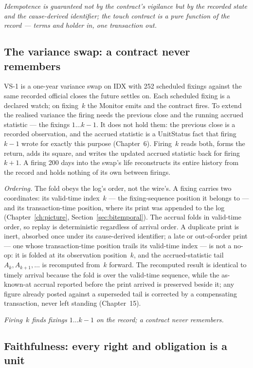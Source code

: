 \emph{Idempotence is guaranteed not by the contract's vigilance but by the
recorded state and the cause-derived identifier; the touch contract is a pure
function of the record --- terms and holder in, one transaction out.}

\subsection{The variance swap: a contract never remembers}

VS-1 is a one-year variance swap on IDX with 252 scheduled fixings against the
same recorded official closes the future settles on. Each scheduled fixing is a
declared watch; on fixing~$k$ the Monitor emits and the contract fires. To
extend the realised variance the firing needs the previous close and the running
accrued statistic --- the fixings $1 \ldots k-1$. It does not hold them: the
previous close is a recorded observation, and the accrued statistic is a
UnitStatus fact that firing~$k-1$ wrote for exactly this purpose (Chapter~6).
Firing~$k$ reads both, forms the return, adds its square, and writes the updated
accrued statistic back for firing~$k+1$. A firing 200 days into the swap's life
reconstructs its entire history from the record and holds nothing of its own
between firings.

\emph{Ordering.} The fold obeys the log's order, not the wire's. A fixing carries
two coordinates: its valid-time index~$k$ --- the fixing-sequence position it
belongs to --- and its transaction-time position, where its print was appended to
the log (Chapter~\ref{ch:picture}, Section~\ref{sec:bitemporal}). The accrual folds
in valid-time order, so replay is deterministic regardless of arrival order. A
duplicate print is inert, absorbed once under its cause-derived identifier; a late
or out-of-order print --- one whose transaction-time position trails its valid-time
index --- is not a no-op: it is folded at its observation position~$k$, and the
accrued-statistic tail $A_k, A_{k+1}, \ldots$ is recomputed from~$k$ forward. The
recomputed result is identical to timely arrival because the fold is over the
valid-time sequence, while the as-known-at accrual reported before the print
arrived is preserved beside it; any figure already posted against a superseded tail
is corrected by a compensating transaction, never left standing (Chapter~15).

\emph{Firing~$k$ finds fixings $1 \ldots k-1$ on the record; a contract never
remembers.}

\subsection{Faithfulness: every right and obligation is a unit}

